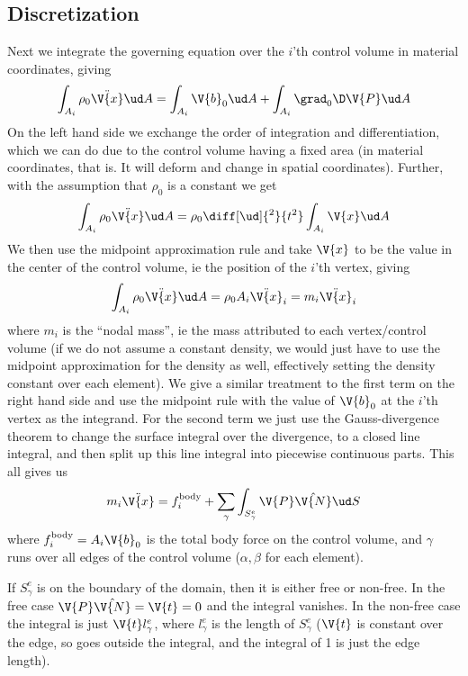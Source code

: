 \documentclass[sigconf]{acmart}
\begin{document}
\subsection{Discretization}
Next we integrate the governing equation over the $ i $'th control volume in material coordinates, giving
\begin{equation}\label{key}
	\int_{A_i} \rho_0 \ddot{\V{x}} \ud A = \int_{A_i} \V{b}_0 \ud A + \int_{A_i} \grad_0 \D \V{P} \ud A
\end{equation}
On the left hand side we exchange the order of integration and differentiation, which we can do due to the control volume having a fixed area (in material coordinates, that is. It will deform and change in spatial coordinates). Further, with the assumption that $ \rho_0 $ is a constant we get
\begin{equation}\label{key}
	\int_{A_i} \rho_0 \ddot{\V{x}} \ud A = \rho_0 \diff[\ud]{^2}{t^2}\int_{A_i} \V{x} \ud A
\end{equation}
We then use the midpoint approximation rule and take $ \V{x} $ to be the value in the center of the control volume, ie the position of the $ i $'th vertex, giving
\begin{equation}\label{key}
	\int_{A_i} \rho_0 \ddot{\V{x}} \ud A = \rho_0 A_i \ddot{\V{x}}_i = m_i \ddot{\V{x}}_i
\end{equation}
where $ m_i $ is the ``nodal mass'', ie the mass attributed to each vertex/control volume (if we do not assume a constant density, we would just have to use the midpoint approximation for the density as well, effectively setting the density constant over each element). We give a similar treatment to the first term on the right hand side and use the midpoint rule with the value of $ \V{b}_0 $ at the $ i $'th vertex as the integrand. For the second term we just use the Gauss-divergence theorem to change the surface integral over the divergence, to a closed line integral, and then split up this line integral into piecewise continuous parts. This all gives us
\begin{equation}\label{key}
	m_i \ddot{\V{x}} = f_i^{\text{body}} + \sum_{\gamma} \int_{S^e_{\gamma}}\V{P}\hat{\V{N}} \ud S
\end{equation}
where $ f_i^{\text{body}} =A_i\V{b}_0$ is the total body force on the control volume, and $ \gamma $ runs over all edges of the control volume ($ \alpha, \beta$ for each element).

If $ S^e_{\gamma} $ is on the boundary of the domain, then it is either free or non-free. In the free case $ \V{P}\hat{\V{N}} =\V{t}=0$ and the integral vanishes. In the non-free case the integral is just $ \V{t}l^e_{\gamma}$, where $ l^e_{\gamma} $ is the length of $ S^e_{\gamma} $ ($ \V{t} $ is constant over the edge, so goes outside the integral, and the integral of 1 is just the edge length).
\end{document}
